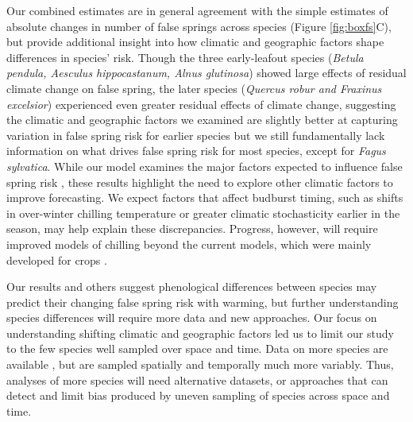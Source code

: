 \documentclass{article}\usepackage[]{graphicx}\usepackage[]{color}
\begin{document}
Our combined estimates are in general agreement with the simple estimates of absolute changes in number of false springs across species (Figure \ref{fig:boxfs}C), but provide additional insight into how climatic and geographic factors shape differences in species' risk.  Though the three early-leafout species (\textit{Betula pendula, Aesculus hippocastanum, Alnus glutinosa}) showed large effects of residual climate change on false spring, the later species (\textit{Quercus robur and Fraxinus excelsior}) experienced even greater residual effects of climate change, suggesting the climatic and geographic factors we examined are slightly better at capturing variation in false spring risk for earlier species but we still fundamentally lack information on what drives false spring risk for most species, except for \textit{Fagus sylvatica}. While our model examines the major factors expected to influence false spring risk \citep{Liu2018,Ma2018,Vitasse2018,Wypych2016a}, these results highlight the need to explore other climatic factors to improve forecasting. We expect factors that affect budburst timing, such as shifts in over-winter chilling temperature or greater climatic stochasticity earlier in the season, may help explain these discrepancies. Progress, however, will require improved models of chilling beyond the current models, which were mainly developed for crops \citep{Luedeling2011,Dennis2003}. 



Our results and others \citep{Ma2018} suggest phenological differences between species may predict their changing false spring risk with warming, but further understanding species differences will require more data and new approaches. Our focus on understanding shifting climatic and geographic factors led us to limit our study to the few species well sampled over space and time. Data on more species are available \citep[e.g., ][]{Ma2018}, but are sampled spatially and temporally much more variably. Thus, analyses of more species will need alternative datasets, or approaches that can detect and limit bias produced by uneven sampling of species across space and time.
\end{document}
